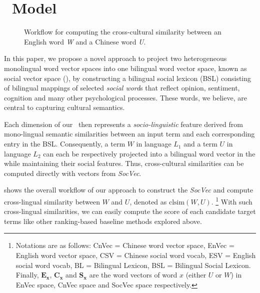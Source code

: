 \section{\socvec ~Model}
\begin{figure}[]
	\centering
	\caption{Workflow for computing the cross-cultural similarity between 
		an English word \textit{W} and a Chinese word \textit{U}.}
	
	\label{fig:overview}
	\vspace{-10pt}
\end{figure}
In this paper, we propose a novel approach to project 
two heterogeneous monolingual word vector spaces into 
one bilingual word vector space, known as 
social vector space (\textit{\socvec}), 
by constructing a bilingual social lexicon (BSL) consisting of bilingual mappings of selected \textit{social word}s
that reflect opinion, sentiment, cognition and many other psychological 
processes. 
These words, we believe, are central to capturing cultural semantics.

Each dimension of our \textit{\socvec}~then represents a \textit{socio-linguistic} feature 
derived from mono-lingual semantic similarities between an input term and 
each corresponding entry in the BSL. 
Consequently, a term $W$ in language $L_1$ and a term $U$ in 
language $L_2$ can each be respectively projected 
into a bilingual word vector in the \textit{\socvec} while maintaining
their social features. Thus, cross-cultural similarities can be computed directly with vectors from \textit{SocVec}. 

 shows the overall workflow of our approach to construct the \textit{SocVec} and compute cross-lingual similarity between $W$ and $U$, denoted as $\text{clsim}(W,U)$. 
\footnote{{\scriptsize Notations are as follows: CnVec = Chinese word vector space, EnVec = English word vector space, CSV = Chinese social word vocab, ESV = English social word vocab, BL = Bilingual Lexicon, BSL = Bilingual Social Lexicon.
Finally, $\mathbf{E_x}$, $\mathbf{C_x}$ and $\mathbf{S_x}$ are the word vectors of word $x$ (either $U$ or $W$) in EnVec space, CnVec space and SocVec space respectively.}} 
With such cross-lingual similarities, we can easily compute the score of each candidate target terms like other ranking-based baseline methods explored above.       
